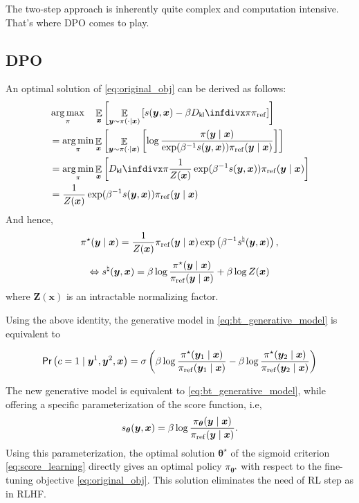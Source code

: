 \documentclass[11pt,a4paper]{article}
\begin{document}
The two-step approach is inherently quite complex and computation intensive. That's where DPO comes to play.

\subsection{DPO}%
\label{sub:dpo}
An optimal solution of \eqref{eq:original_obj} can be derived as follows:
\begin{align*}
&\argmax_{\pi} \quad \mathop{\mathbb{E}}_{\bm{x}} \left[ \mathop{\mathbb{E}}_{\bm{y} \sim \pi(\cdot \mid \bm{x})} \left[  s(\bm{y}, \bm{x}) - \beta \Dkl{\pi}{\pi_{\rm ref}}\right] \right] \\
&= \argmin_{\pi} \mathop{\mathbb{E}}_{\bm{x}} \left[ \mathop{\mathbb{E}}_{\bm{y} \sim \pi(\cdot \mid \bm{x})} \left[ \log \dfrac{\pi(\bm{y}\mid \bm{x})}{\exp(\beta^{-1}s(\bm{y}, \bm{x})) \pi_{\rm ref}(\bm{y} \mid \bm{x})} \right] \right]\\
&=\argmin_{\pi} \mathop{\mathbb{E}}_{\bm{x}} \left[  \Dkl{\pi}{\dfrac{1}{Z(\bm{x})} \exp(\beta^{-1} s(\bm{y}, \bm{x})) \pi_{\rm ref}(\bm{y} \mid \bm{x})} \right] \\
&= \dfrac{1}{Z(\bm{x})} \exp(\beta^{-1} s(\bm{y}, \bm{x})) \pi_{\rm ref}(\bm{y} \mid \bm{x})
\end{align*}
And hence,
\[
\pi^{\star }(\bm{y} \mid \bm{x}) = \dfrac{1}{Z(\bm{x})} \pi_{\rm ref}(\bm{y} \mid \bm{x}) \exp \left( \beta^{-1}  s^{\natural}(\bm{y}, \bm{x}) \right),
\] 
\[
\Leftrightarrow 
s^{\natural}(\bm{y}, \bm{x}) = \beta \log \dfrac{\pi^{\star }(\bm{y} \mid \bm{x})}{\pi_{\rm ref}(\bm{y} \mid \bm{x})} + \beta \log Z(\bm{x})
\] 
where $\bm{Z}(\bm{x})$ is an intractable normalizing factor.

Using the above identity, the generative model in \eqref{eq:bt_generative_model} is equivalent to
\begin{tcolorbox}[center]
\begin{equation}
\label{eq:dpo_generative_model}
\textsf{Pr}\left(c=1 \mid \bm{y}^{1},\bm{y}^{2}, \bm{x}\right) = \sigma \left( \beta \log \dfrac{\pi^{\star }(\bm{y}_1\mid \bm{x})}{\pi_{\rm ref}(\bm{y}_1 \mid \bm{x})} - \beta \log \dfrac{\pi^{\star }(\bm{y}_2\mid \bm{x})}{\pi_{\rm ref}(\bm{y}_2 \mid \bm{x})} \right)
\end{equation}
\end{tcolorbox}

The new generative model is equivalent to \eqref{eq:bt_generative_model}, while offering a specific parameterization of the score function, i.e, 
\[
s_{\boldsymbol \theta}(\bm{y}, \bm{x}) = \beta \log \dfrac{\pi_{\boldsymbol \theta}(\bm{y} \mid \bm{x})}{\pi_{\rm ref}(\bm{y} \mid \bm{x})}.
\] 
Using this parameterization, the optimal solution $\boldsymbol \theta^{\star }$ of the sigmoid criterion \eqref{eq:score_learning} directly gives an optimal policy $\pi_{\boldsymbol \theta^{\star }}$ with respect to the fine-tuning objective \eqref{eq:original_obj}. This solution eliminates the need of RL step as in RLHF.
\end{document}

